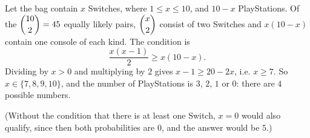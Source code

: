 Let the bag contain $x$ Switches, where $1\le x\le10$, and $10-x$ PlayStations. Of the $\dbinom{10}{2}=45$ equally likely pairs, $\dbinom x2$ consist of two Switches and $x(10-x)$ contain one console of each kind. The condition is
\[\dfrac{x(x-1)}{2}\ge x(10-x).\]
Dividing by $x>0$ and multiplying by $2$ gives $x-1\ge20-2x$, i.e. $x\ge7$. So $x\in\{7,8,9,10\}$, and the number of PlayStations is $3$, $2$, $1$ or $0$: there are $\boxed{4}$ possible numbers.

(Without the condition that there is at least one Switch, $x=0$ would also qualify, since then both probabilities are $0$, and the answer would be $5$.)
